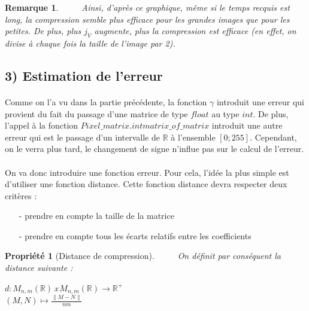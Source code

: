 \documentclass[a4paper,10pt]{report}
\theoremstyle{break}
\newtheorem{Prop}{Propri\'{e}t\'{e}}
\newtheorem{Rem}{Remarque}
\begin{document}
    \begin{Rem}
      $\phantom{Prop}$ Ainsi, d'apr\`{e}s ce graphique, m\^{e}me si le temps recquis est long, la compression semble plus efficace 
	pour les grandes images que pour les petites. De plus, plus $j_V$ augmente, plus la compression est efficace (en effet,
	on divise \`{a} chaque fois la taille de l'image par 2).
    \end{Rem}

    
  \subsection*{3) Estimation de l'erreur}
  
    \paragraph{} Comme on l'a vu dans la partie pr\'{e}c\'{e}dente, la fonction $\gamma$ introduit une erreur qui provient du fait 
	du passage d'une matrice de type $float$ au type $int$. De plus, l'appel \`{a} la fonction $Pixel\_matrix.intmatrix\_of\_matrix$
	introduit une autre erreur qui est le passage d'un intervalle de $\mathbb{R}$ \`{a} l'ensemble $[0;255]$.
	Cependant, on le verra plus tard, le changement de signe n'influe pas sur le calcul de l'erreur.
	
    \paragraph{} On va donc introduire une fonction erreur. Pour cela, l'id\'{e}e la plus simple est d'utiliser une fonction distance.
	Cette fonction distance devra respecter deux crit\`{e}res :
	\begin{itemize}
	 \item [-] prendre en compte la taille de la matrice
	 \item [-] prendre en compte tous les \'{e}carts relatifs entre les coefficients
	\end{itemize}

	
    \begin{Prop}[Distance de compression]
      $\phantom{Prop}$ On d\'{e}finit par cons\'{e}quent la distance suivante :
      \begin{center}
	$d : M_{n,m}(\mathbb{R}) \, $x$ \, M_{n,m}(\mathbb{R}) \longrightarrow \mathbb{R}^+ $ \\
	$ (M, N) \longmapsto \frac{\parallel M - N \parallel}{n m} $
      \end{center}

    \end{Prop}
    
\end{document}
